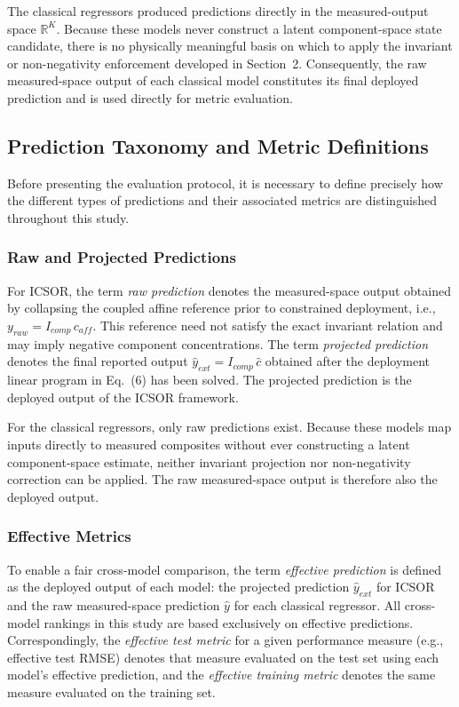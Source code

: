 \documentclass[11pt]{article}
\begin{document}
The classical regressors produced predictions directly in the measured-output space $\mathbb{R}^K$. Because these models never construct a latent component-space state candidate, there is no physically meaningful basis on which to apply the invariant or non-negativity enforcement developed in Section~2. Consequently, the raw measured-space output of each classical model constitutes its final deployed prediction and is used directly for metric evaluation.

\subsection{Prediction Taxonomy and Metric Definitions}

Before presenting the evaluation protocol, it is necessary to define precisely how the different types of predictions and their associated metrics are distinguished throughout this study.

\subsubsection{Raw and Projected Predictions}

For ICSOR, the term \textit{raw prediction} denotes the measured-space output obtained by collapsing the coupled affine reference prior to constrained deployment, i.e., $y_{raw} = I_{comp}\, c_{aff}$. This reference need not satisfy the exact invariant relation and may imply negative component concentrations. The term \textit{projected prediction} denotes the final reported output $\hat{y}_{ext} = I_{comp}\, \hat{c}$ obtained after the deployment linear program in Eq.~(6) has been solved. The projected prediction is the deployed output of the ICSOR framework.

For the classical regressors, only raw predictions exist. Because these models map inputs directly to measured composites without ever constructing a latent component-space estimate, neither invariant projection nor non-negativity correction can be applied. The raw measured-space output is therefore also the deployed output.

\subsubsection{Effective Metrics}

To enable a fair cross-model comparison, the term \textit{effective prediction} is defined as the deployed output of each model: the projected prediction $\hat{y}_{ext}$ for ICSOR and the raw measured-space prediction $\hat{y}$ for each classical regressor. All cross-model rankings in this study are based exclusively on effective predictions. Correspondingly, the \textit{effective test metric} for a given performance measure (e.g., effective test RMSE) denotes that measure evaluated on the test set using each model's effective prediction, and the \textit{effective training metric} denotes the same measure evaluated on the training set.
\end{document}

